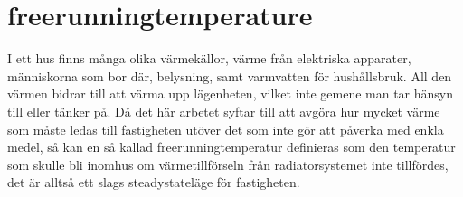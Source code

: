 \section*{freerunningtemperature}
I ett hus finns många olika värmekällor, värme från elektriska apparater, människorna som bor där, belysning, samt varmvatten för hushållsbruk. All den värmen bidrar till att värma upp lägenheten, vilket inte gemene man tar hänsyn till eller tänker på. Då det här arbetet syftar till att avgöra hur mycket värme som måste ledas till fastigheten utöver det som inte gör att påverka med enkla medel, så kan en så kallad freerunningtemperatur definieras som den temperatur som skulle bli inomhus om värmetillförseln från radiatorsystemet inte tillfördes, det är alltså ett slags steadystateläge för fastigheten.